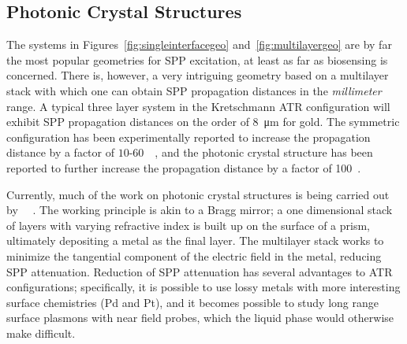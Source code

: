 \subsection{Photonic Crystal Structures}
The systems in Figures~\ref{fig:singleinterfacegeo} and~\ref{fig:multilayergeo} are by far the most popular geometries for SPP
excitation, at least as far as biosensing is concerned.  There
is, however, a very intriguing geometry based on a multilayer stack with
which one can obtain SPP propagation distances in the \textit{millimeter}
range.  A typical three layer system in the Kretschmann ATR configuration
will exhibit SPP propagation distances on the order of
\SI{8}{\micro\meter} for gold.  The symmetric configuration has been
experimentally reported to increase the
propagation distance by a factor of
$10$-$60$~\cite{kuwamura1983experimental}~\cite{craig1983experimental}, and the photonic crystal structure
has been reported to further increase the propagation distance by a factor of
100~\cite{konopsky2009long}.

Currently, much of the work on photonic crystal structures is being carried
out by ~\cite{konopsky2006long}~\cite{konopsky2009long}.
The working principle is akin to a Bragg mirror; a one dimensional stack of
layers with varying refractive index is built up on the surface of a prism,
ultimately depositing a metal as the final layer.  The multilayer stack
works to minimize the tangential component of the electric field in the
metal, reducing SPP attenuation.  Reduction of SPP attenuation has several
advantages to ATR configurations; specifically, it is possible to use lossy metals with
more interesting surface chemistries (Pd and Pt), and it becomes possible
to study long range surface plasmons with near field probes, which the
liquid phase would otherwise make difficult.
